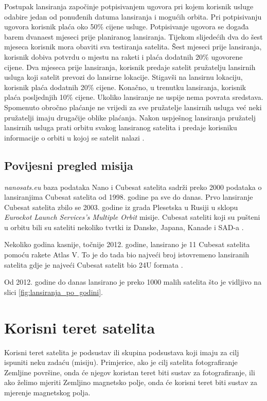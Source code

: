 \documentclass[times, utf8, diplomski, numeric]{templates/template}
\begin{document}
{{            Postupak lansiranja započinje potpisivanjem ugovora pri kojem korisnik usluge odabire jedan od ponuđenih datuma lansiranja i mogućih orbita. Pri potpisivanju ugovora korisnik plaća oko 50\% cijene usluge. Potpisivanje ugovora se događa barem dvanaest mjeseci prije planiranog lansiranja. Tijekom slijedećih dva do šest mjeseca korisnik mora obaviti sva testiranja satelita. Šest mjeseci prije lansiranja, korisnik dobiva potvrdu o mjestu na raketi i plaća dodatnih 20\% ugovorene cijene. Dva mjeseca prije lansiranja, korisnik predaje satelit pružatelju lansirnih usluga koji satelit prevozi do lansirne lokacije. Stigavši na lansirnu lokaciju, korisnik plaća dodatnih 20\% cijene. Konačno, u trenutku lansiranja, korisnik plaća posljednjih 10\% cijene. Ukoliko lansiranje ne uspije nema povrata sredstava. Spomenuto obročno plaćanje ne vrijedi za sve pružatelje lansirnih usluga već neki pružatelji imaju drugačije oblike plaćanja. Nakon uspješnog lansiranja pružatelj lansirnih usluga prati orbitu svakog lansiranog satelita i predaje korisniku informacije o orbiti u kojoj se satelit nalazi \cite{fersat}. 
        
        \subsection{Povijesni pregled misija}{
            \emph{nanosats.eu} baza podataka Nano i Cubesat satelita \cite{nanosats} sadrži preko 2000 podataka o lansiranjima Cubesat satelita od 1998. godine pa sve do danas. Prvo lansiranje Cubesat satelita zbilo se 2003. godine iz grada Plesetska u Rusiji u sklopu \emph{Eurockot Launch Services's Multiple Orbit} misije. Cubesat sateliti koji su pušteni u orbitu bili su sateliti nekoliko tvrtki iz Danske, Japana, Kanade i SAD-a \cite{prva_misija}.

            Nekoliko godina kasnije, točnije 2012. godine, lansirano je 11 Cubesat satelita pomoću rakete Atlas V. To je do tada bio najveći broj istovremeno lansiranih satelita gdje je najveći Cubesat satelit bio 24U formata \cite{najveci_lansirni_broj}.

            Od 2012. godine do danas lansirano je preko 1000 malih satelita što je vidljivo na slici \ref{fig:lansiranja_po_godini}.
        }
    }

    \section{Korisni teret satelita}{
        Korisni teret satelita  je podsustav ili skupina podsustava koji imaju za cilj ispuniti neku zadaću (misiju). Primjerice, ako je cilj satelita fotografiranje Zemljine površine, onda će njegov koristan teret biti sustav za fotografiranje, ili ako želimo mjeriti Zemljino magnetsko polje, onda će korisni teret biti sustav za mjerenje magnetskog polja.

}}
\end{document}
